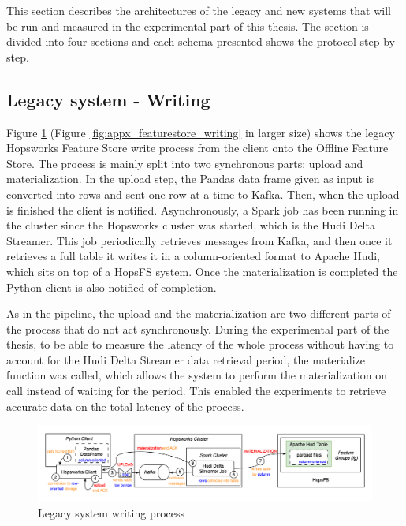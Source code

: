 This section describes the architectures of the legacy and new systems that will be run and measured in the experimental part of this thesis. The section is divided into four sections and each schema presented shows the protocol step by step.

\subsection{Legacy system - Writing}
\label{subsec:legacy_sys_writing}

Figure \ref{fig:featurestore_writing} (Figure \ref{fig:appx_featurestore_writing} in larger size) shows the legacy Hopsworks Feature Store write process from the client onto the Offline Feature Store. The process is mainly split into two synchronous parts: upload and materialization. In the upload step, the Pandas data frame given as input is converted into rows and sent one row at a time to Kafka. Then, when the upload is finished the client is notified. Asynchronously, a Spark job has been running in the cluster since the Hopsworks cluster was started, which is the Hudi Delta Streamer. This job periodically retrieves messages from Kafka, and then once it retrieves a full table it writes it in a column-oriented format to Apache Hudi, which sits on top of a \gls{HopsFS} system. Once the materialization is completed the Python client is also notified of completion.

As in the pipeline, the upload and the materialization are two different parts of the process that do not act synchronously. During the experimental part of the thesis, to be able to measure the latency of the whole process without having to account for the Hudi Delta Streamer data retrieval period, the materialize function was called, which allows the system to perform the materialization on call instead of waiting for the period. This enabled the experiments to retrieve accurate data on the total latency of the process.

\begin{figure}
    \begin{center}
      \includegraphics[width=\textwidth]{figures/2-background/FeatureStore-writing.png}
    \end{center}
    \caption{Legacy system writing process}
    \label{fig:featurestore_writing}
\end{figure}


